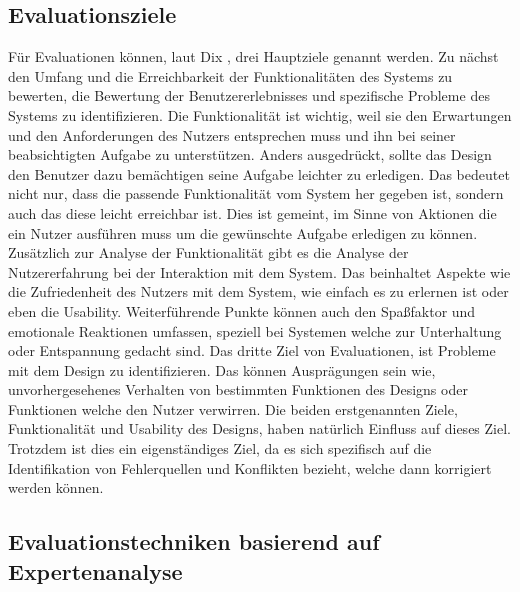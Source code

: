 \documentclass[draft=false
              ,paper=a4
              ,twoside=false
              ,fontsize=11pt
              ,headsepline
              ,BCOR10mm
              ,DIV11
              ]{scrbook}
\begin{document}
\subsection{Evaluationsziele} %
\label{sub:evaluationsziele}

Für Evaluationen können, laut Dix \cite{alan_dix_human-computer_2004}, drei Hauptziele genannt werden. Zu nächst den Umfang und die Erreichbarkeit der Funktionalitäten des Systems zu bewerten, die Bewertung der Benutzererlebnisses und spezifische Probleme des Systems zu identifizieren. Die Funktionalität ist wichtig, weil sie den Erwartungen und den Anforderungen des Nutzers entsprechen muss und ihn bei seiner beabsichtigten Aufgabe zu unterstützen. Anders ausgedrückt, sollte das Design den Benutzer dazu bemächtigen seine Aufgabe leichter zu erledigen. Das bedeutet nicht nur, dass die passende Funktionalität vom System her gegeben ist, sondern auch das diese leicht erreichbar ist. Dies ist gemeint, im Sinne von Aktionen die ein Nutzer ausführen muss um die gewünschte Aufgabe erledigen zu können.
Zusätzlich zur Analyse der Funktionalität gibt es die Analyse der  Nutzererfahrung bei der Interaktion mit dem System. Das beinhaltet Aspekte wie die Zufriedenheit des Nutzers mit dem System, wie einfach es zu erlernen ist oder eben die Usability. Weiterführende Punkte können auch den Spaßfaktor und emotionale Reaktionen umfassen, speziell bei Systemen welche zur Unterhaltung oder Entspannung gedacht sind. 
Das dritte Ziel von Evaluationen, ist Probleme mit dem Design zu identifizieren. Das können Ausprägungen sein wie, unvorhergesehenes Verhalten von bestimmten Funktionen des Designs oder Funktionen welche den Nutzer verwirren. Die beiden erstgenannten Ziele, Funktionalität und Usability des Designs, haben natürlich Einfluss auf dieses Ziel. Trotzdem ist dies ein eigenständiges Ziel, da es sich spezifisch auf die Identifikation von Fehlerquellen und Konflikten bezieht, welche dann korrigiert werden können.

\subsection{Evaluationstechniken basierend auf Expertenanalyse} %
\label{sub:evaluationstechniken_basierend_auf_expertenanalyse}
\end{document}
